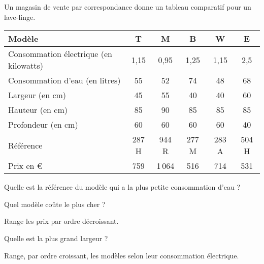 Un magasin de vente par correspondance donne un tableau comparatif
pour un lave-linge.
\begin{center}
\begin{tabularx}{13cm}{|X|c|c|c|c|c|}
\hline
Modèle&T&M&B&W&E\\
\hline
Consommation électrique (en kilowatts)&1,15&0,95&1,25&1,15&2,5\\
\hline
Consommation d'eau (en litres)&55&52&74&48&68\\
\hline
Largeur (en cm)&45&55&40&40&60\\
Hauteur (en cm)&85&90&85&85&85\\
Profondeur (en cm)&60&60&60&60&40\\
\hline
Référence&287 H&944 R&277 M&283 A&504 H\\
\hline
Prix en \textgreek{\euro}&759&1\,064&516&714&531\\
\hline
\end{tabularx}
\end{center}
\begin{myenumerate}
\item Quelle est la référence du modèle qui a la plus petite
consommation d'eau ?
\item Quel modèle coûte le plus cher ?\par Range les prix par ordre
décroissant.
\item Quelle est la plus grand largeur ?
\item Range, par ordre croissant, les modèles selon leur consommation
électrique.
\end{myenumerate}